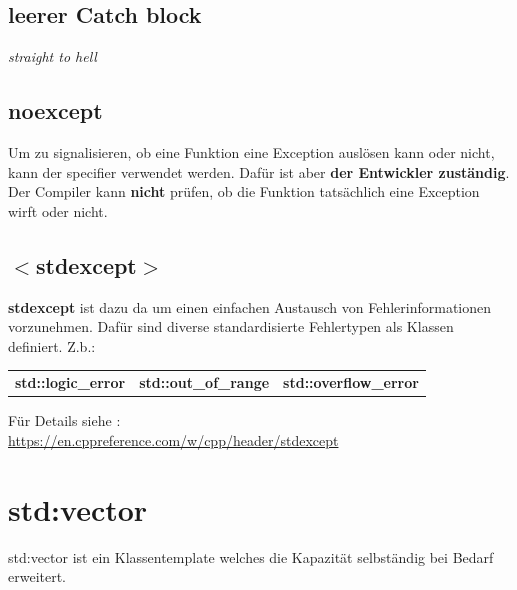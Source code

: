 \subsection{leerer Catch block}

\colorbox{red!50}{\textit{straight to hell}}

\subsection{noexcept}

Um zu signalisieren, ob eine Funktion eine Exception auslösen kann oder nicht, kann der specifier  verwendet werden. 
Dafür ist aber \textbf{der Entwickler zuständig}. 
Der Compiler kann \textbf{nicht} prüfen, ob die Funktion tatsächlich eine Exception wirft oder nicht. 

\subsection{$<$stdexcept$>$}

\textbf{stdexcept} ist dazu da um einen einfachen Austausch von Fehlerinformationen vorzunehmen. 
Dafür sind diverse standardisierte Fehlertypen als Klassen definiert. Z.b.:\\
\begin{tabular}{ccc} \textbf{std::logic\_error} & \textbf{std::out\_of\_range} & \textbf{std::overflow\_error} \end{tabular}
Für Details siehe :\\
\url{https://en.cppreference.com/w/cpp/header/stdexcept}
\section{std:vector}
std:vector ist ein Klassentemplate welches die Kapazität selbständig bei Bedarf erweitert.
